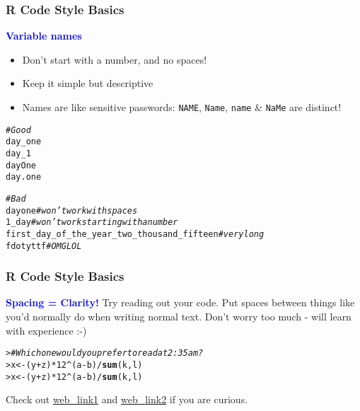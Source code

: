 \documentclass[13pt,aspectratio=169]{beamer}\usepackage[]{graphicx}\usepackage[]{color}
\makeatletter
\newcommand{\hlnum}[1]{\textcolor[rgb]{0.686,0.059,0.569}{#1}}%
\newcommand{\hlcom}[1]{\textcolor[rgb]{0.678,0.584,0.686}{\textit{#1}}}%
\newcommand{\hlopt}[1]{\textcolor[rgb]{0,0,0}{#1}}%
\newcommand{\hlstd}[1]{\textcolor[rgb]{0.345,0.345,0.345}{#1}}%
\newcommand{\hlkwb}[1]{\textcolor[rgb]{0.69,0.353,0.396}{#1}}%
\newcommand{\hlkwd}[1]{\textcolor[rgb]{0.737,0.353,0.396}{\textbf{#1}}}%
\newenvironment{kframe}{%
 \def\at@end@of@kframe{}%
 \ifinner\ifhmode%
  \def\at@end@of@kframe{\end{minipage}}%
  \begin{minipage}{\columnwidth}%
 \fi\fi%
 \def\FrameCommand##1{\hskip\@totalleftmargin \hskip-\fboxsep
 \colorbox{shadecolor}{##1}\hskip-\fboxsep
     \hskip-\linewidth \hskip-\@totalleftmargin \hskip\columnwidth}%
 \MakeFramed {\advance\hsize-\width
   \@totalleftmargin\z@ \linewidth\hsize
   \@setminipage}}%
 {\par\unskip\endMakeFramed%
 \at@end@of@kframe}
\newenvironment{knitrout}{}{} %
\newcommand{\tc}[2]{\textcolor{#1}{#2}}
\renewcommand{\tt}[1]{\texttt{#1}}
\renewenvironment{knitrout}{\setlength{\topsep}{0mm}}{}
\makeatother
\begin{document}
\begin{frame}[fragile]
    \frametitle{R Code Style Basics}
    \textbf{\tc{Blue}{Variable names}}
    \begin{itemize}
	\item Don't start with a number, and no spaces!
	\item Keep it simple but descriptive
	\item Names are like sensitive passwords:
	    \tt{NAME}, \tt{Name}, \tt{name} \& \tt{NaMe} are distinct!
    \end{itemize}
\begin{knitrout}\small
{}\color{fgcolor}\begin{kframe}
\begin{alltt}
\hlcom{# Good}
day_one
day_1
dayOne
day.one

\hlcom{# Bad}
day one \hlcom{# won't work with spaces}
1_day \hlcom{# won't work starting with a number}
first_day_of_the_year_two_thousand_fifteen \hlcom{# very long}
fdotyttf \hlcom{# OMG LOL}
\end{alltt}
\end{kframe}
\end{knitrout}
\end{frame}

\begin{frame}[fragile]
    \frametitle{R Code Style Basics}
    \textbf{\tc{Blue}{Spacing = Clarity!}}
	    \vskip10pt
	    Try reading out your code. Put spaces between things like you'd
	    normally do when writing normal text.
	    \vskip10pt
	    Don't worry too much - will learn with experience :-)
\begin{knitrout}\small
{}\color{fgcolor}\begin{kframe}
\begin{alltt}
\hlstd{> }\hlcom{# Whichonewouldyouprefertoreadat2:35am?}
\hlstd{> }\hlstd{x} \hlkwb{<-} \hlstd{(y} \hlopt{+} \hlstd{z)} \hlopt{*} \hlnum{12} \hlopt{^} \hlstd{(a} \hlopt{-} \hlstd{b)} \hlopt{/} \hlkwd{sum}\hlstd{(k, l)}
\hlstd{> }\hlstd{x}\hlkwb{<-}\hlstd{(y}\hlopt{+}\hlstd{z)}\hlopt{*}\hlnum{12}\hlopt{^}\hlstd{(a}\hlopt{-}\hlstd{b)}\hlopt{/}\hlkwd{sum}\hlstd{(k,l)}
\end{alltt}
\end{kframe}
\end{knitrout}

Check out \href{https://google-styleguide.googlecode.com/svn/trunk/Rguide.xml}{web\_link1}
and \href{http://adv-r.had.co.nz/Style.html}{web\_link2} if you are curious.
\end{frame}
\end{document}
